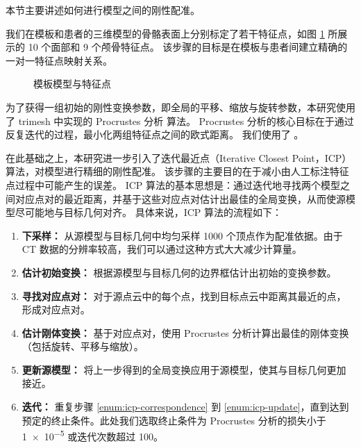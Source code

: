 本节主要讲述如何进行模型之间的刚性配准。

我们在模板和患者的三维模型的骨骼表面上分别标定了若干特征点，如图 \ref{fig:landmarks} 所展示的 10 个面部和 9 个颅骨特征点。
该步骤的目标是在模板与患者间建立精确的一对一特征点映射关系。

\begin{figure}
  \centering
   \quad
  \caption{模板模型与特征点}
  \label{fig:landmarks}
\end{figure}

为了获得一组初始的刚性变换参数，即全局的平移、缩放与旋转参数，本研究使用了 trimesh \cite{trimesh} 中实现的 Procrustes 分析 \cite{rossProcrustesAnalysis2004} 算法。
Procrustes 分析的核心目标在于通过反复迭代的过程，最小化两组特征点之间的欧式距离。
我们使用了 。

在此基础之上，本研究进一步引入了迭代最近点（Iterative Closest Point，ICP）算法，对模型进行精细的刚性配准。
该步骤的主要目的在于减小由人工标注特征点过程中可能产生的误差。
ICP 算法的基本思想是：通过迭代地寻找两个模型之间对应点对的最近距离，并基于这些对应点对估计出最佳的全局变换，从而使源模型尽可能地与目标几何对齐。
具体来说，ICP 算法的流程如下：
\begin{enumerate}
  \item \textbf{下采样：} 从源模型与目标几何中均匀采样 \num{1000} 个顶点作为配准依据。由于 CT 数据的分辨率较高，我们可以通过这种方式大大减少计算量。
  \item \textbf{估计初始变换：} 根据源模型与目标几何的边界框估计出初始的变换参数。
  \item \label{enum:icp-correspondence} \textbf{寻找对应点对：} 对于源点云中的每个点，找到目标点云中距离其最近的点，形成对应点对。
  \item \textbf{估计刚体变换：} 基于对应点对，使用 Procrustes 分析计算出最佳的刚体变换（包括旋转、平移与缩放）。
  \item \label{enum:icp-update} \textbf{更新源模型：} 将上一步得到的全局变换应用于源模型，使其与目标几何更加接近。
  \item \textbf{迭代：} 重复步骤 \ref{enum:icp-correspondence} 到 \ref{enum:icp-update}，直到达到预定的终止条件。此处我们选取终止条件为 Procrustes 分析的损失小于 \num{1e-5} 或迭代次数超过 \num{100}。
\end{enumerate}

